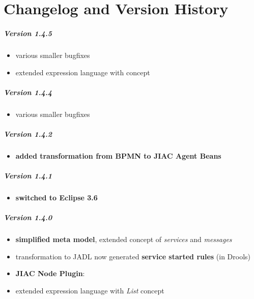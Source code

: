 \chapter{Changelog and Version History}
\label{sec:changelog}


\paragraph{Version 1.4.5}

\begin{itemize}
	\item various smaller bugfixes
	\item extended expression language with  concept
\end{itemize}

\paragraph{Version 1.4.4}

\begin{itemize}
	\item various smaller bugfixes
\end{itemize}

\paragraph{Version 1.4.2}

\begin{itemize}
	\item \textbf{added transformation from BPMN to JIAC Agent Beans}
\end{itemize}

\paragraph{Version 1.4.1}

\begin{itemize}
	\item \textbf{switched to Eclipse 3.6}
\end{itemize}

\paragraph{Version 1.4.0}

\begin{itemize}
	\item \textbf{simplified meta model}, extended concept of \emph{services} and \emph{messages}
	\item transformation to JADL now generated \textbf{service started rules} (in Drools)
	\item \textbf{JIAC Node Plugin}:
	\item extended expression language with \emph{List} concept
\end{itemize}

